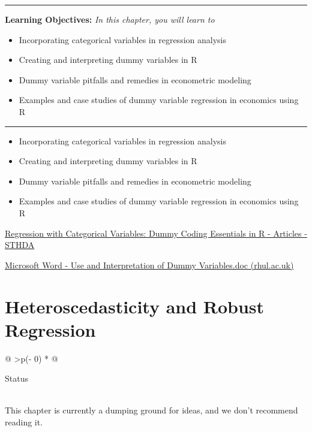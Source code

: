 \documentclass[
  letterpaper,
  paper =a4,
  twoside,
  openright,
  headsepline,
  footsepline,
  listof = totocnumbered,
  chapterprefix = true,
  firstiscover]{scrbook}
\providecommand{\abstractname}{Learning Objectives} %
\newenvironment{objectives}[1]{%
	\hrule
	\vspace{5pt}
	\small\textbf{\abstractname: } 
	\newline
	\vspace{0.1cm}
	\small\emph{#1} %
	\itshape %
}{%
	\vspace{5pt}
	\hrule
	\vspace{0.6cm}
}
\begin{document}
\begin{objectives}{In this chapter, you will learn to}
\begin{itemize}

\item{Incorporating categorical variables in regression analysis}

\item{Creating and interpreting dummy variables in R}

\item{Dummy variable pitfalls and remedies in econometric modeling}

\item{Examples and case studies of dummy variable regression in economics using R}

\end{itemize}

\end{objectives}

\begin{itemize}
\item
  Incorporating categorical variables in regression analysis
\item
  Creating and interpreting dummy variables in R
\item
  Dummy variable pitfalls and remedies in econometric modeling
\item
  Examples and case studies of dummy variable regression in economics
  using R
\end{itemize}

\href{http://sthda.com/english/articles/40-regression-analysis/163-regression-with-categorical-variables-dummy-coding-essentials-in-r/}{Regression
with Categorical Variables: Dummy Coding Essentials in R - Articles -
STHDA}

\href{http://www.personal.rhul.ac.uk/uhte/006/ec2203/Use\%20and\%20Interpretation\%20of\%20Dummy\%20Variables.pdf}{Microsoft
Word - Use and Interpretation of Dummy Variables.doc (rhul.ac.uk)}


\hypertarget{heteroscedasticity-and-robust-regression}{%
\chapter{Heteroscedasticity and Robust
Regression}\label{heteroscedasticity-and-robust-regression}}

\begin{longtable}[]{@{}
  >{\centering\arraybackslash}p{(\columnwidth - 0\tabcolsep) * }@{}}
\toprule\noalign{}
\begin{minipage}[b]{\linewidth}\centering
Status
\end{minipage} \\
\midrule\noalign{}
\endhead
\bottomrule\noalign{}
\endlastfoot
This chapter is currently a dumping ground for ideas, and we don't
recommend reading it. \\
\end{longtable}
\end{document}
